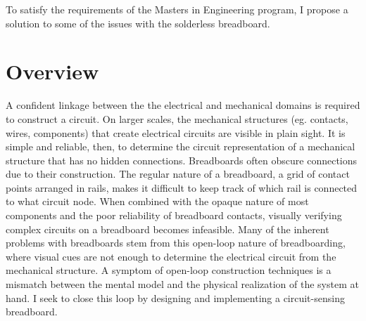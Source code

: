 \documentclass[11pt, a4paper]{article}
\begin{document}
To satisfy the requirements of the Masters in Engineering program, I propose a solution to some of the issues with the solderless breadboard.

\section{Overview}

A confident linkage between the the electrical and mechanical domains is required to construct a circuit.
On larger scales, the mechanical structures (eg. contacts, wires, components) that create electrical circuits are visible in plain sight.
It is simple and reliable, then, to determine the circuit representation of a mechanical structure that has no hidden connections.
Breadboards often obscure connections due to their construction.
The regular nature of a breadboard, a grid of contact points arranged in rails, makes it difficult to keep track of which rail is connected to what circuit node.
When combined with the opaque nature of most components and the poor reliability of breadboard contacts, visually verifying complex circuits on a breadboard becomes infeasible.
Many of the inherent problems with breadboards stem from this open-loop nature of breadboarding, where visual cues are not enough to determine the electrical circuit from the mechanical structure.
A symptom of open-loop construction techniques is a mismatch between the mental model and the physical realization of the system at hand.
I seek to close this loop by designing and implementing a circuit-sensing breadboard.




\end{document}
